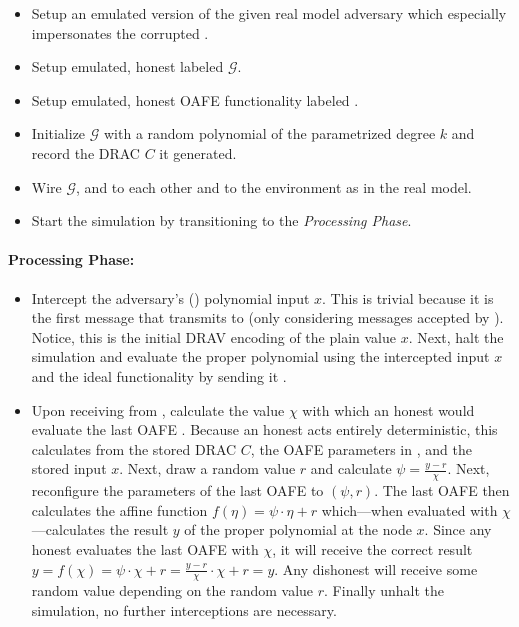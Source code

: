 \begin{itemize}

  \item Setup an emulated version of the given real model adversary
    \JWadv{} which especially impersonates the corrupted \JWpTwo{}.

  \item Setup emulated, honest \JWpOne{} labeled $\mathcal{G}$.

  \item Setup emulated, honest OAFE functionality labeled \JWfuncSymOAFE{}.

  \item Initialize $\mathcal{G}$ with a random polynomial of the parametrized
    degree $k$ and record the DRAC $C$ it generated.

  \item Wire $\mathcal{G}$, \JWfuncSymOAFE{} and \JWadv{} to each other
    and \JWadv{} to the environment as in the real model.

  \item Start the simulation by transitioning to the \emph{Processing Phase}.

\end{itemize}

\paragraph{Processing Phase:}

\begin{itemize}

  \item Intercept the adversary's (\JWadv{}) polynomial input $x$. This is
    trivial because it is the first message that \JWadv{} transmits to
    \JWfuncSymOAFE{} (only considering messages accepted by \JWfuncSymOAFE{}).
    Notice, this is the initial DRAV encoding of the plain value $x$. Next, halt
    the simulation and evaluate the proper polynomial using the intercepted
    input $x$ and the ideal functionality \JWfuncSymOPEnp{} by sending it
    .

  \item Upon receiving  from \JWfuncSymOPEnp{},
    calculate the value $\chi$ with which an honest \JWpTwo{} would evaluate the
    last OAFE . Because an honest \JWpTwo{} acts entirely deterministic, this
    calculates from the stored DRAC $C$, the OAFE parameters in \JWfuncSymOAFE,
    and the stored input $x$. Next, draw a random value $r$ and calculate $\psi
    = \frac{y-r}{\chi}$. Next, reconfigure the parameters of the last OAFE to
    $(\psi, r)$. The last OAFE then calculates the affine function $f(\eta) =
    \psi \cdot \eta + r$ which---when evaluated with $\chi$---calculates the
    result $y$ of the proper polynomial at the node $x$. Since any honest
    \JWpTwo{} evaluates the last OAFE with $\chi$, it will receive the correct
    result $y = f(\chi) = \psi \cdot \chi + r = \frac{y-r}{\chi} \cdot \chi + r
    = y$. Any dishonest \JWpTwo{} will receive some random value depending on
    the random value $r$. Finally unhalt the simulation, no further
    interceptions are necessary.

\end{itemize}


